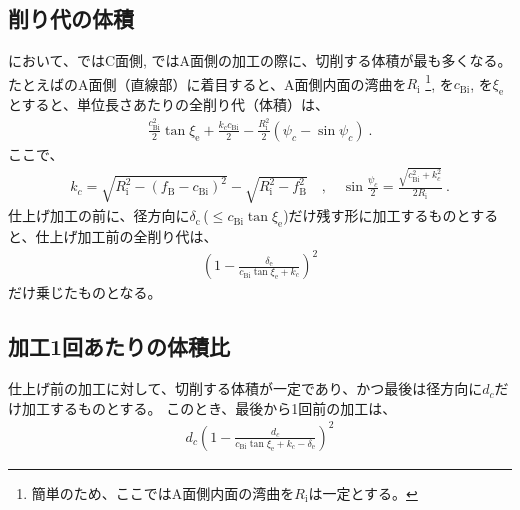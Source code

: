 \subsection{削り代の体積}
\EndFaceChamferMilling において、\EndFaceOutChamferMilling ではC面側, \EndFaceInChamferMilling ではA面側の加工の際に、切削する体積が最も多くなる。
たとえば\BottomEndFaceInCChamfer のA面側（直線部）に着目すると、A面側内面の湾曲を$R_\mathrm i$%
\footnote{簡単のため、ここではA面側内面の湾曲を$R_\mathrm i$は一定とする。},
\EndFaceInCChamferLength を$c_\mathrm{Bi}$, \EndFaceInCChamferAngle を$\xi_\mathrm e$とすると、単位長さあたりの全削り代（体積）は、
\begin{align*}
  \frac{c_\mathrm{Bi}^2}2\tan\xi_\mathrm e
  +\frac{k_cc_\mathrm{Bi}}2
  -\frac{R_\mathrm i^2}2(\psi_c-\sin\psi_c)\ .
\end{align*}
ここで、
\begin{align*}
  k_c = \sqrt{R_\mathrm i^2-(f_\mathrm B-c_\mathrm{Bi})^2}
        -\sqrt{R_\mathrm i^2-f_\mathrm B^2}\quad, \quad
  \sin\frac{\psi_c}2 = \frac{\sqrt{c_\mathrm{Bi}^2+k_c^2}}{2R_\mathrm i}\ .
\end{align*}
仕上げ加工の前に、径方向に$\delta_\mathrm c$\,($\leq c_\mathrm{Bi}\tan\xi_\mathrm e$)だけ残す形に加工するものとすると、仕上げ加工前の全削り代は、
\begin{align*}
  \left(1-\frac{\delta_\mathrm e}{c_\mathrm{Bi}\tan\xi_\mathrm e+k_c}\right)^2
\end{align*}
だけ乗じたものとなる。


\subsection{加工1回あたりの体積比\TBW}
仕上げ前の加工に対して、切削する体積が一定であり、かつ最後は径方向に$d_c$だけ加工するものとする。
このとき、最後から1回前の加工は、
\begin{align*}
  d_c\left(1-\frac{d_c}{c_\mathrm{Bi}\tan\xi_\mathrm e+k_c-\delta_\mathrm e}\right)^2
\end{align*}



